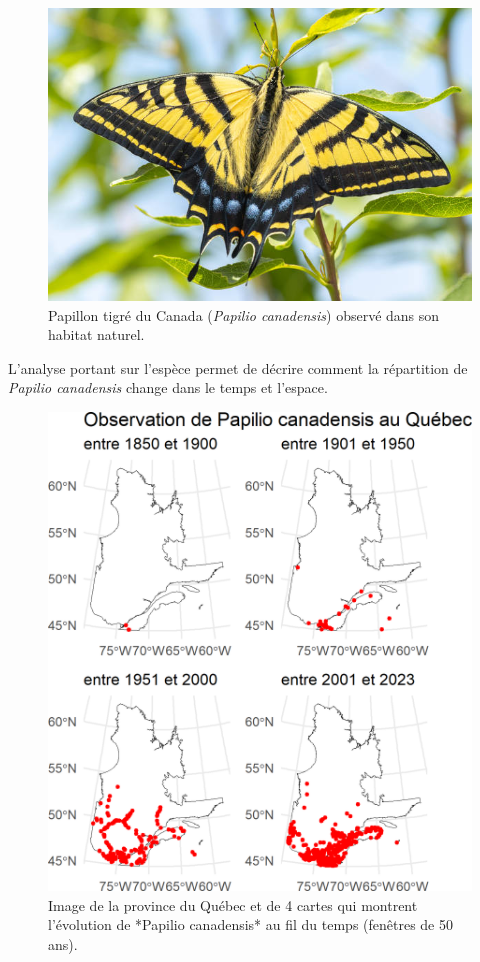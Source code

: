 \documentclass[9pt,twocolumn,twoside,]{pnas-new}
\begin{document}
\begin{figure}
\centering
\includegraphics{Papilio_canadensis.png}
\caption{Papillon tigré du Canada (\emph{Papilio canadensis}) observé
dans son habitat naturel.}
\end{figure}

L'analyse portant sur l'espèce permet de décrire comment la répartition
de \emph{Papilio canadensis} change dans le temps et l'espace.

\begin{figure}

\includegraphics[width=1\linewidth]{../Figures_analyse/cartes_pcanadensis} \hfill{}

\caption{Image de la province du Québec et de 4 cartes qui montrent l'évolution de *Papilio canadensis* au fil du temps (fenêtres de 50 ans).}\label{fig:fig_cartes_pcanadensis, fullpage-figure}
\end{figure}
\end{document}
